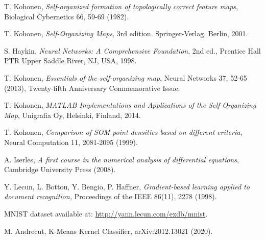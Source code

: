\documentclass[10pt,english]{article}
\begin{document}
\begin{thebibliography}{99}

 T. Kohonen, \textit{Self-organized formation of topologically correct feature maps}, Biological Cybernetics 66, 59-69 (1982).

 T. Kohonen, \textit{Self-Organizing Maps}, 3rd edition. Springer-Verlag, Berlin, 2001. 

 S. Haykin, \textit{Neural Networks: A Comprehensive Foundation}, 2nd ed., Prentice Hall PTR Upper Saddle River, NJ, USA, 1998.

 T. Kohonen, \textit{Essentials of the self-organizing map}, Neural Networks 37, 52-65 (2013), Twenty-fifth Anniversary Commemorative Issue.

 T. Kohonen, \textit{MATLAB Implementations and Applications of the Self-Organizing Map}, Unigrafia Oy, Helsinki, Finland, 2014.

 T. Kohonen, \textit{Comparison of SOM point densities based on different criteria}, Neural Computation 11, 2081-2095 (1999).

 A. Iserles, \textit{A first course in the numerical analysis of differential equations}, Cambridge University Press (2008). 

	Y. Lecun, L. Bottou, Y. Bengio, P. Haffner, 
				\textit{Gradient-based learning applied to document recognition,} 
				Proceedings of the IEEE 86(11), 2278 (1998).

 MNIST dataset available at:	\url{http://yann.lecun.com/exdb/mnist}.

 M. Andrecut, K-Means Kernel Classifier, arXiv:2012.13021 (2020).

				
\end{thebibliography}
\end{document}
